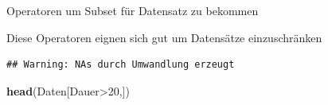 \documentclass[ignorenonframetext,]{beamer}
\newenvironment{Shaded}{}{}
\newcommand{\KeywordTok}[1]{\textcolor[rgb]{0.00,0.44,0.13}{\textbf{{#1}}}}
\newcommand{\DecValTok}[1]{\textcolor[rgb]{0.25,0.63,0.44}{{#1}}}
\newcommand{\StringTok}[1]{\textcolor[rgb]{0.25,0.44,0.63}{{#1}}}
\newcommand{\NormalTok}[1]{{#1}}
\begin{document}
\begin{frame}[fragile]{Operatoren um Subset für Datensatz zu bekommen}

Diese Operatoren eignen sich gut um Datensätze einzuschränken

\begin{Shaded}
\end{Shaded}

\begin{verbatim}
## Warning: NAs durch Umwandlung erzeugt
\end{verbatim}

\begin{Shaded}
\begin{Highlighting}[]
\KeywordTok{head}\NormalTok{(Daten[Dauer>}\DecValTok{20}\NormalTok{,])}
\end{Highlighting}
\end{Shaded}


\end{frame}
\end{document}
